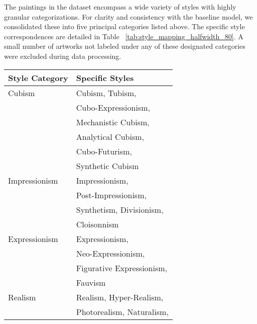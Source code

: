 The paintings in the dataset encompass a wide variety of styles with highly
granular categorizations. For clarity and consistency with the baseline model,
we consolidated these into five principal categories listed above. The specific
style correspondences are detailed in Table ~\ref{tab:style_mapping_halfwidth_80}. A small number of artworks not
labeled under any of these designated categories were excluded during data
processing.
\begin{table}[ht]
    \centering
    \small
    \begin{tabular}{@{}p{} p{}@{}}
        \toprule
        \textbf{Style Category} & \textbf{Specific Styles}         \\
        \midrule
        Cubism                  & Cubism, Tubism,                  \\
                                & Cubo-Expressionism,              \\
                                & Mechanistic Cubism,              \\
                                & Analytical Cubism,               \\
                                & Cubo-Futurism,                   \\
                                & Synthetic Cubism                 \\
        \midrule
        Impressionism           & Impressionism,                   \\
                                & Post-Impressionism,              \\
                                & Synthetism, Divisionism,         \\
                                & Cloisonnism                      \\
        \midrule
        Expressionism           & Expressionism,                   \\
                                & Neo-Expressionism,               \\
                                & Figurative Expressionism,        \\
                                & Fauvism                          \\
        \midrule
        Realism                 & Realism, Hyper-Realism,          \\
                                & Photorealism, Naturalism,        \\

\end{tabular}
\end{table}
